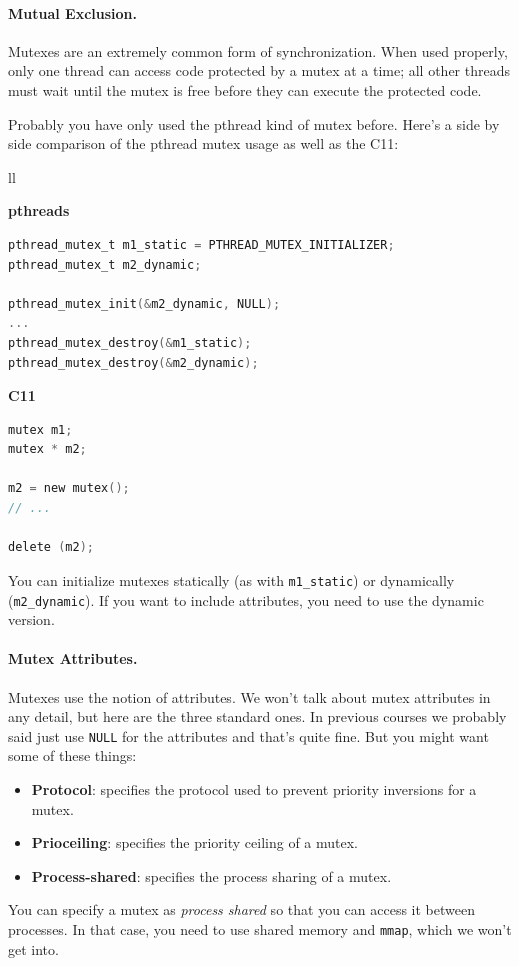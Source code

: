 \documentclass[a4paper]{report}
\newcommand{\CPP}{C\nolinebreak\hspace{-.05em}\raisebox{.4ex}{\tiny\bf +}\nolinebreak\hspace{-.10em}\raisebox{.4ex}{\tiny\bf +}}
\def\CPP{{C\nolinebreak[4]\hspace{-.05em}\raisebox{.4ex}{\tiny\bf ++}}}
\begin{document}
\paragraph{Mutual Exclusion.} Mutexes are an extremely common form of synchronization. When used properly, only one thread can access code protected by a mutex at a time; all other threads must wait until the mutex is free before they can execute the protected code.

Probably you have only used the pthread kind of mutex before. Here's a side by side comparison of the pthread mutex usage as well as the \CPP11:
    
    \begin{tabular}{ll}
      \begin{minipage}{.65\textwidth}
        {\bf pthreads}
  \begin{lstlisting}[language=C]
pthread_mutex_t m1_static = PTHREAD_MUTEX_INITIALIZER;
pthread_mutex_t m2_dynamic;

pthread_mutex_init(&m2_dynamic, NULL);
...
pthread_mutex_destroy(&m1_static);
pthread_mutex_destroy(&m2_dynamic);
  \end{lstlisting}
      \end{minipage}
      \begin{minipage}{.35\textwidth}
        {\bf \CPP11}
  \begin{lstlisting}[language=C]
mutex m1;
mutex * m2;

m2 = new mutex();
// ...

delete (m2);
  \end{lstlisting}
      \end{minipage}
    \end{tabular}

You can initialize mutexes statically (as with {\tt m1\_static}) or
dynamically ({\tt m2\_dynamic}). If you want to include attributes,
you need to use the dynamic version.

\paragraph{Mutex Attributes.} Mutexes use the notion of attributes.
We won't talk about mutex attributes in any detail, but here are the three standard ones. In previous courses we probably said just use \texttt{NULL} for the attributes and that's quite fine. But you might want some of these things:
  \begin{itemize}
    \item {\bf Protocol}: specifies the protocol used to prevent priority
      inversions for a mutex.
    \item {\bf Prioceiling}: specifies the priority ceiling of a mutex.
    \item {\bf Process-shared}: specifies the process sharing of a mutex.
  \end{itemize}
  You can specify a mutex as {\it process shared} so that you can access it
  between processes. In that case, you need to use shared memory and {\tt mmap},
  which we won't get into.
\end{document}
